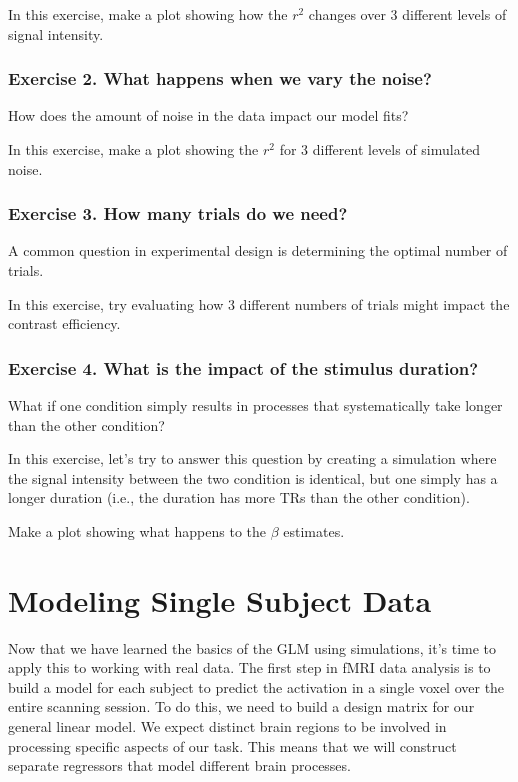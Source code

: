 \documentclass[letterpaper,10pt,english]{sphinxmanual}
\begin{document}
In this exercise, make a plot showing how the \(r^2\) changes over 3 different levels of signal intensity.


\subsubsection{Exercise 2. What happens when we vary the noise?}
\label{\detokenize{content/GLM:exercise-2-what-happens-when-we-vary-the-noise}}
How does the amount of noise in the data impact our model fits?

In this exercise, make a plot showing the \(r^2\) for 3 different levels of simulated noise.


\subsubsection{Exercise 3. How many trials do we need?}
\label{\detokenize{content/GLM:exercise-3-how-many-trials-do-we-need}}
A common question in experimental design is determining the optimal number of trials.

In this exercise, try evaluating how 3 different numbers of trials might impact the contrast efficiency.


\subsubsection{Exercise 4. What is the impact of the stimulus duration?}
\label{\detokenize{content/GLM:exercise-4-what-is-the-impact-of-the-stimulus-duration}}
What if one condition simply results in processes that systematically take longer than the other condition?

In this exercise, let’s try to answer this question by creating a simulation where the signal intensity between the two condition is identical, but one simply has a longer duration (i.e., the duration has more TRs than the other condition).

Make a plot showing what happens to the \(\beta\) estimates.


\section{Modeling Single Subject Data}
\label{\detokenize{content/GLM_Single_Subject_Model:modeling-single-subject-data}}\label{\detokenize{content/GLM_Single_Subject_Model::doc}}

Now that we have learned the basics of the GLM using simulations, it’s time to apply this to working with real data. The first step in fMRI data analysis is to build a model for each subject to predict the activation in a single voxel over the entire scanning session. To do this, we need to build a design matrix for our general linear model. We expect distinct brain regions to be involved in processing specific aspects of our task. This means that we will construct separate regressors that model different brain processes.
\end{document}
